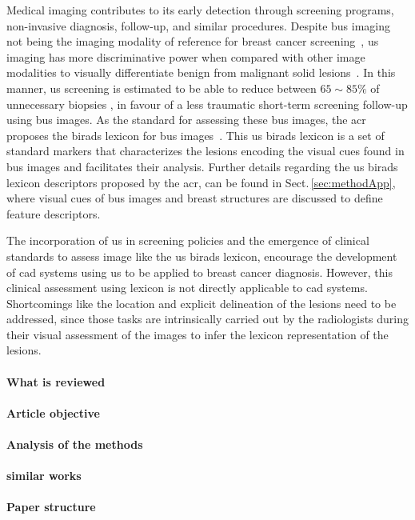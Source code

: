 Medical imaging contributes to its early detection through screening programs, non-invasive diagnosis, follow-up, and similar procedures.
Despite \ac{bus} imaging not being the imaging modality of reference for breast cancer screening~\cite{smith2003american}, \ac{us} imaging has more discriminative power when compared with other image modalities to visually differentiate benign from malignant solid lesions~\cite{Stavros:1995p12392}.
In this manner, \ac{us} screening is estimated to be able to reduce
between $65\sim85\%$ of unnecessary biopsies%
, in favour of a less traumatic short-term screening follow-up using \ac{bus} images.
As the standard for assessing these \ac{bus} images, the \ac{acr} proposes the \ac{birads} lexicon for \ac{bus} images~\cite{biradsus}.
This \ac{us} \ac{birads} lexicon is a set of standard markers that characterizes the lesions encoding the visual cues found in \ac{bus} images and facilitates their analysis.
Further details regarding the \ac{us} \ac{birads} lexicon descriptors proposed by the \ac{acr}, can be found in Sect.\,\ref{sec:methodApp}, where visual cues of \ac{bus} images and breast structures are discussed to define feature descriptors.

The incorporation of \ac{us} in screening policies and the emergence of clinical standards to assess image like the \ac{us} \ac{birads} lexicon, encourage the development of \ac{cad} systems using \ac{us} to be applied to breast cancer diagnosis.
However, this clinical assessment using lexicon is not directly applicable to \ac{cad} systems.
Shortcomings like the location and explicit delineation of the lesions need to be addressed, since those tasks are intrinsically carried out by the radiologists during their visual assessment of the images to infer the lexicon representation of the lesions.

\paragraph{What is reviewed}
\label{sec:intro:what_is_reviewed}

\paragraph{Article objective}
\label{sec:intro:article_objective}

\paragraph{Analysis of the methods}
\label{sec:intro:analysis_of_the_methods}

\paragraph{similar works}
\label{sec:intro:similar_works}

\paragraph{Paper structure}
\label{sec:intro:paper_structure}


